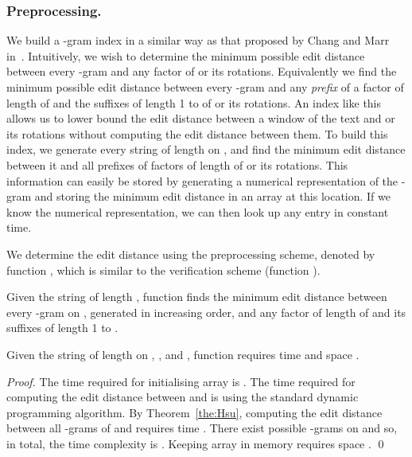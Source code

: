 \documentclass[runningheads, envcountsame, a4paper]{llncs}\usepackage{etex}
\newenvironment{myfunction}[2][htbp]
  {\setlength{\algomargin}{.2cm}
    \begin{center}
    \begin{minipage}{#2}
    \begin{function}[#1]
    \small
     \let\Par=\par
       \def\par{\endgraf\vspace{.1cm}}
           \SetKw{To}{to}\SetKw{Downto}{downto}\SetKw{Or}{or}\SetKwFor{Algo}{Function}{}{}\vspace{.15cm}}
   {\let\par=\Par
     \end{function}\end{minipage}\end{center}}
\begin{document}
\subsubsection*{Preprocessing.}
We build a -gram index in a similar way as that proposed by Chang and Marr in~\cite{Chang}. Intuitively, we wish to determine the minimum possible edit distance between every -gram and any factor of  or its rotations. Equivalently we find the minimum possible edit distance between every -gram and any {\em prefix} of a factor of length  of  and the suffixes of length 1 to  of  or its rotations. An index like this allows us to lower bound the edit distance between a window of the text and  or its rotations without computing the edit distance between them. To build this index, we generate every string of length  on , and find the minimum edit distance between it and all prefixes of factors of length  of  or its rotations. This information can easily be stored by generating a numerical representation of the -gram and storing the minimum edit distance in an array at this location. If we know the numerical representation, we can then look up any entry in constant 
time. 

We determine the edit distance using the preprocessing scheme, denoted by function , which is 
similar to the verification scheme (function ). 

Given the string  of length , function  finds the minimum edit distance between every -gram on , generated in increasing order, and any factor  of length  of  and its suffixes of length 1 to .

\begin{lemma}\label{lemm:pre}
Given the string  of length  on , , and , 
function   requires time  and space .
\end{lemma}

\begin{proof}
The time required for initialising array  is .
The time required for computing the edit distance between  and  is  using the standard dynamic programming algorithm. 
By Theorem~\ref{the:Hsu}, computing the edit distance between all -grams of  and  requires time .
There exist  possible -grams on  and so, in total, the time complexity is . Keeping array  in memory requires space . \qed
\end{proof}

  \begin{myfunction}[H]{11 cm}
  \end{myfunction}
\end{document}
